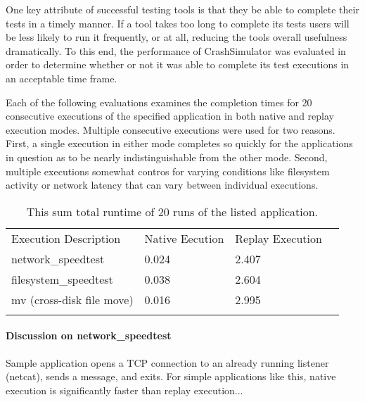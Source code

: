 
One key attribute of successful testing tools is that they be able to complete their tests in a timely manner.
If a tool takes too long to complete its tests users will be less likely to run it frequently, or at all,
reducing the tools overall usefulness dramatically. To this end, the performance of CrashSimulator was evaluated
in order to determine whether or not it was able to complete its test executions in an acceptable time frame.

Each of the following evaluations examines the completion times for 20 consecutive executions of the specified
application in both native and replay execution modes.  Multiple consecutive executions were used for two
reasons.  First, a single execution in either mode completes so quickly for the applications in question as to
be nearly indistinguishable from the other mode.  Second, multiple executions somewhat contros for varying
conditions like filesystem activity or network latency that can vary between individual executions.

    \begin{table}[H]
        \scriptsize{}
        \begin{tabular}{l  l  l  l}
            \toprule{}
                Execution Description & Native Eecution & Replay Execution\\
                network\_speedtest & 0.024 & 2.407 \\
                filesystem\_speedtest & 0.038 & 2.604 \\
                mv (cross-disk file move) & 0.016 & 2.995 \\
            \bottomrule{}
        \end{tabular}
        \caption{This sum total runtime of 20 runs of the listed application.}
    \end{table}

\paragraph{Discussion on network\_speedtest}

Sample application opens a TCP connection to an already running listener (netcat), sends a message, and
exits. For simple applications like this, native execution is significantly faster than replay execution...

